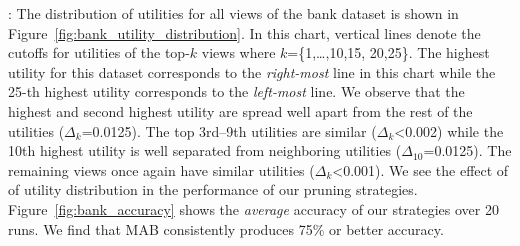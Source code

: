 :
The distribution of utilities for all views of the bank dataset is
shown in Figure~\ref{fig:bank_utility_distribution}. 
In this chart, vertical lines denote the cutoffs for utilities of the top-$k$ views
where $k$=\{1,\ldots,10,15, 20,25\}.
The highest utility for this dataset corresponds to the {\it right-most} line
in this chart while the 25-th highest utility corresponds to the {\it left-most}
line. 
We observe that the highest and second highest utility are spread well apart 
from the rest of the utilities ($\Delta_k$=0.0125). 
The top 3rd--9th utilities are similar ($\Delta_k$<0.002) while the 10th highest 
utility is well separated from neighboring utilities ($\Delta_{10}$=0.0125).
The remaining views once again have similar utilities ($\Delta_k$<0.001).
We see the effect of of utility distribution in the performance of our pruning 
strategies.
Figure~\ref{fig:bank_accuracy} shows the {\it average} accuracy of our strategies over 20 runs.
We find that MAB consistently produces 75\% or better accuracy.
